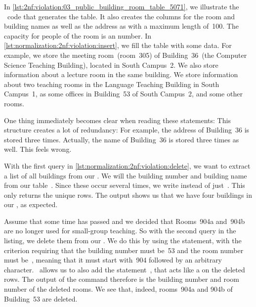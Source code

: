 In \cref{lst:2nf:violation:03_public_building_room_table_5071}, we illustrate the \sql\ code that generates the table.
It also creates the columns for the room and building names as well as the address as  with a maximum length of~100.
The capacity for people of the room is an  number.
In \cref{lst:normalization:2nf:violation:insert}, we fill the table with some data.
For example, we store the meeting room~(room~305) of Building~36~(the Computer Science Teaching Building), located in South Campus~2.
We also store information about a lecture room in the same building.
We store information about two teaching rooms in the Language Teaching Building in South Campus~1, as some offices in Building~53 of South Campus~2, and some other rooms.

One thing immediately becomes clear when reading these  statements:
This structure creates a lot of redundancy:
For example, the address of Building~36 is stored three times.
Actually, the name of Building~36 is stored three times as well.
This feels wrong.

With the first query in \cref{lst:normalization:2nf:violation:delete}, we want to extract a list of all buildings from our \db.
We will  the building number and building name from our table~.
Since these occur several times, we write  instead of just~.
This only returns the unique rows.
The output shows us that we have four buildings in our \db, as expected.

Assume that some time has passed and we decided that Rooms~904a and~904b are no longer used for small-group teaching.
So with the second query in the listing, we delete them from our \db.
We do this by using the  statement, with the~ criterion requiring that the building number must be~53 and the room number must be~, meaning that it must start with~904 followed by an arbitrary character.
\postgresql\ allows us to also add the  statement~\cite{PGDG:PD:RDFMR}, that acts like a  on the deleted rows.
The output of the command therefore is the building number and room number of the deleted rooms.
We see that, indeed, rooms~904a and 904b of Building~53 are deleted.

